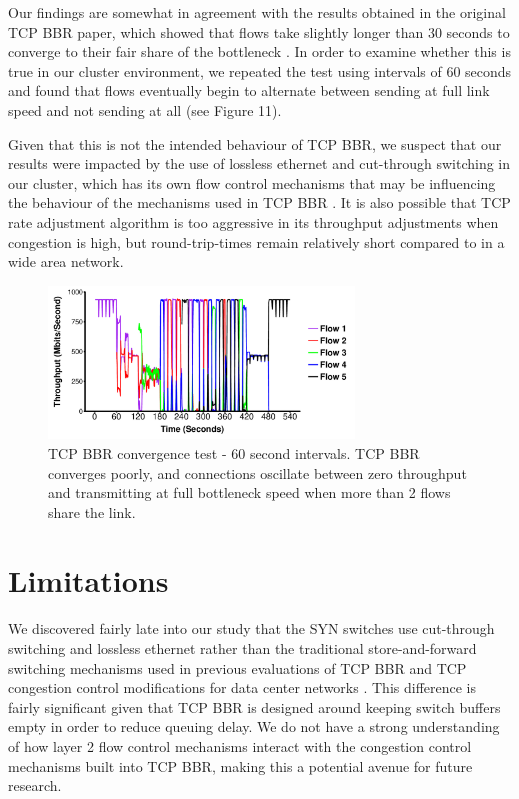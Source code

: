 \documentclass[letterpaper,twocolumn,10pt]{article}
\begin{document}
Our findings are somewhat in agreement with the results obtained in the original TCP BBR paper, which showed that flows take slightly longer than 30 seconds to converge to their fair share of the bottleneck \cite{cardwell_bbr:_2016}. In order to examine whether this is true in our cluster environment, we repeated the test using intervals of 60 seconds and found that flows eventually begin to alternate between sending at full link speed and not sending at all (see Figure 11). 

Given that this is not the intended behaviour of TCP BBR, we suspect that our results were impacted by the use of lossless ethernet and cut-through switching in our cluster, which has its own flow control mechanisms that may be influencing the behaviour of the mechanisms used in TCP BBR \cite{cardwell_bbr:_2016}. It is also possible that TCP rate adjustment algorithm is too aggressive in its throughput adjustments when congestion is high, but round-trip-times remain relatively short compared to in a wide area network.

\begin{figure}
\includegraphics[height=1.6in,width=3.2in]{plots/bbr_converg_long.pdf}
\caption{TCP BBR convergence test - 60 second intervals. TCP BBR converges poorly, and connections oscillate between zero throughput and transmitting at full bottleneck speed when more than 2 flows share the link.}
\end{figure}

\section{Limitations}

We discovered fairly late into our study that the SYN switches use cut-through switching and lossless ethernet rather than the traditional store-and-forward switching mechanisms used in previous evaluations of TCP BBR and TCP congestion control modifications for data center networks \cite{alizadeh_data_2010, cardwell_bbr:_2016, wu_ictcp:_2013}. This difference is fairly significant given that TCP BBR is designed around keeping switch buffers empty in order to reduce queuing delay. We do not have a strong understanding of how layer 2 flow control mechanisms interact with the congestion control mechanisms built into TCP BBR, making this a potential avenue for future research. 
\end{document}
